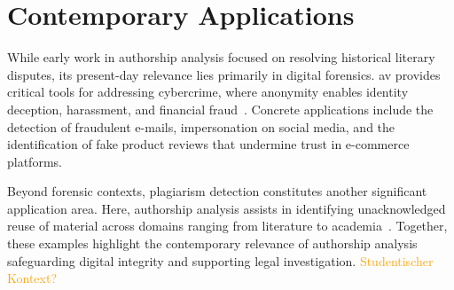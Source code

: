 \section{Contemporary Applications} %

While early work in authorship analysis focused on resolving historical literary disputes, its present-day relevance lies primarily in digital forensics. %
\ac{av} provides critical tools for addressing cybercrime, where anonymity enables identity deception, harassment, and financial fraud~\citep{abbasi_writeprints_2008,uchendu_authorship_2020,bhattacharjee_fighting_2024}. 
Concrete applications include the detection of fraudulent e-mails, impersonation on social media, and the identification of fake product reviews that undermine trust in e-commerce platforms. 

Beyond forensic contexts, plagiarism detection constitutes another significant application area. 
Here, authorship analysis assists in identifying unacknowledged reuse of material across domains ranging from literature to academia~\citep{neal_surveying_2018}. 
Together, these examples highlight the contemporary relevance of authorship analysis safeguarding digital integrity and supporting legal investigation.
\textcolor{orange}{Studentischer Kontext?}